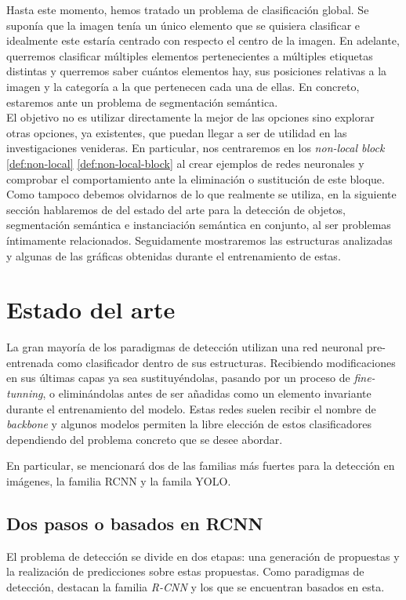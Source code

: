 Hasta este momento, hemos tratado un problema de clasificación global. Se suponía que la imagen tenía un único elemento que se quisiera clasificar e idealmente este estaría centrado con respecto el centro de la imagen. En adelante, querremos clasificar múltiples elementos pertenecientes a múltiples etiquetas distintas y querremos saber cuántos elementos hay, sus posiciones relativas a la imagen y la categoría a la que pertenecen cada una de ellas. En concreto, estaremos ante un problema de segmentación semántica.\\

El objetivo no es utilizar directamente la mejor de las opciones sino explorar otras opciones, ya existentes, que puedan llegar a ser de utilidad en las investigaciones venideras. En particular, nos centraremos en los \emph{non-local block} \autoref{def:non-local} \autoref{def:non-local-block} al crear ejemplos de redes neuronales y comprobar el comportamiento ante la eliminación o sustitución de este bloque.\\

Como tampoco debemos olvidarnos de lo que realmente se utiliza, en la siguiente sección hablaremos de del estado del arte para la detección de objetos, segmentación semántica e instanciación semántica en conjunto, al ser problemas íntimamente relacionados. Seguidamente mostraremos las estructuras analizadas y algunas de las gráficas obtenidas durante el entrenamiento de estas.

\chapter{Estado del arte}
La gran mayoría de los paradigmas de detección utilizan una red neuronal pre-entrenada como clasificador dentro de sus estructuras. Recibiendo modificaciones en sus últimas capas ya sea sustituyéndolas, pasando por un proceso de \emph{fine-tunning}, o eliminándolas antes de ser añadidas como un elemento invariante durante el entrenamiento del modelo. Estas redes suelen recibir el nombre de \emph{backbone} y algunos modelos permiten la libre elección de estos clasificadores dependiendo del problema concreto que se desee abordar.\newline

En particular, se mencionará dos de las familias más fuertes para la detección en imágenes, la familia RCNN y la famila YOLO.

\section{Dos pasos o basados en RCNN}
El problema de detección se divide en dos etapas: una generación de propuestas y la realización de predicciones sobre estas propuestas. Como paradigmas de detección, destacan la familia \emph{R-CNN} y los que se encuentran basados en esta.\newline

